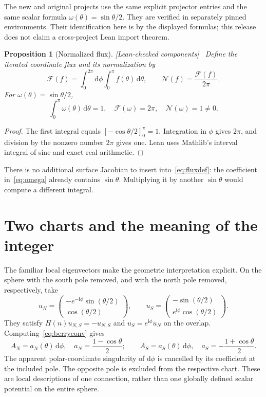 \documentclass[11pt]{article}
\newtheorem{proposition}[theorem]{Proposition}
\theoremstyle{definition}\newtheorem{definition}[theorem]{Definition}
\theoremstyle{remark}\newtheorem{remark}[theorem]{Remark}
\newcommand{\ii}{\mathrm{i}}
\newcommand{\dd}{\mathrm{d}}
\newcommand{\checked}{\textnormal{\small[Lean-checked components]}\ }
\begin{document}
The new and original projects use the same explicit projector entries and the same scalar formula $\omega(\theta)=\sin\theta/2$. They are verified in separately pinned environments. Their identification here is by the displayed formulas; this release does not claim a cross-project Lean import theorem.

\begin{proposition}[Normalized flux]\label{prop:flux}\checked
Define the iterated coordinate flux and its normalization by
\begin{equation}\label{eq:fluxdef}
 \mathcal F(f)=\int_0^{2\pi}\!\dd\phi\int_0^\pi f(\theta)\,\dd\theta,
 \qquad \mathcal N(f)=\frac{\mathcal F(f)}{2\pi}.
\end{equation}
For $\omega(\theta)=\sin\theta/2$,
\begin{equation}\label{eq:unit}
 \int_0^\pi\omega(\theta)\,\dd\theta=1,\quad
 \mathcal F(\omega)=2\pi,\quad \mathcal N(\omega)=1\neq0.
\end{equation}
\end{proposition}
\begin{proof}
The first integral equals $[-\cos\theta/2]_0^\pi=1$. Integration in $\phi$ gives $2\pi$, and division by the nonzero number $2\pi$ gives one. Lean uses Mathlib's interval integral of sine and exact real arithmetic.
\end{proof}
There is no additional surface Jacobian to insert into~\eqref{eq:fluxdef}: the coefficient in~\eqref{eq:omega} already contains $\sin\theta$. Multiplying it by another $\sin\theta$ would compute a different integral.

\section{Two charts and the meaning of the integer}
The familiar local eigenvectors make the geometric interpretation explicit. On the sphere with the south pole removed, and with the north pole removed, respectively, take
\begin{equation}\label{eq:states}
 u_N=\begin{pmatrix}-e^{-\ii\phi}\sin(\theta/2)\\\cos(\theta/2)\end{pmatrix},
 \qquad
 u_S=\begin{pmatrix}-\sin(\theta/2)\\e^{\ii\phi}\cos(\theta/2)\end{pmatrix}.
\end{equation}
They satisfy $H(n)u_{N,S}=-u_{N,S}$ and $u_S=e^{\ii\phi}u_N$ on the overlap. Computing~\eqref{eq:berryconv} gives
\begin{equation}\label{eq:charts}
 A_N=a_N(\theta)\,\dd\phi,\quad a_N=\frac{1-\cos\theta}{2};
 \qquad A_S=a_S(\theta)\,\dd\phi,\quad a_S=-\frac{1+\cos\theta}{2}.
\end{equation}
The apparent polar-coordinate singularity of $\dd\phi$ is cancelled by its coefficient at the included pole. The opposite pole is excluded from the respective chart. These are local descriptions of one connection, rather than one globally defined scalar potential on the entire sphere.
\end{document}
